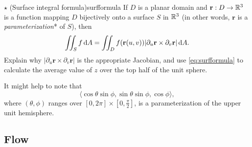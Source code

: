 \documentclass{watsonbook}
\begin{document}
\begin{exercise}{$\star$ (Surface integral formula)}{surfformula}
  If $D$ is a planar domain and $\mathbf{r}:D \to \mathbb{R}^3$ is a function
  mapping $D$ bijectively onto a surface $S$ in $\mathbb{R}^3$ (in other words,
  $\mathbf{r}$ is a \textit{parameterization}* of $S$), then
  \begin{equation} \label{eq:surfformula} 
    \iint_S f \, {\mathrm{d}}A = \iint_D f(\mathbf{r}(u,v)) |\partial_u
    \mathbf{r} \times \partial_v \mathbf{r}| \, {\mathrm{d}}A. 
  \end{equation}
  Explain why $|\partial_u
    \mathbf{r} \times \partial_v \mathbf{r}|$ is the appropriate
    Jacobian, and use \eqref{eq:surfformula} to calculate the average value of
    $z$ over the top half of the unit sphere.

    It might help to note that
    \[
      \langle \cos \theta \sin \phi, \sin \theta \sin \phi, \cos
      \phi
      \rangle, 
    \]
    where $(\theta,\phi)$ ranges over $[0,2\pi] \times
    [0,\tfrac{\pi}{2}]$, is a parameterization of the upper unit
    hemisphere. 
\end{exercise}

\subsection{Flow}

\end{document}
